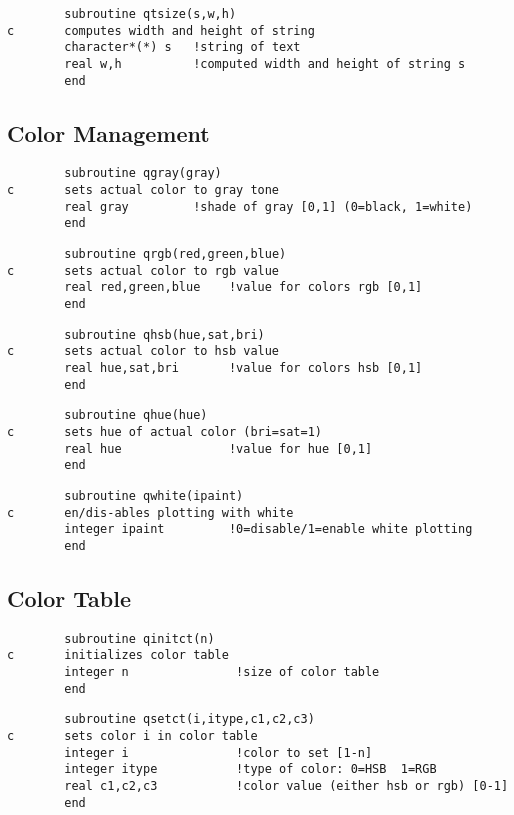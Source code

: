 \documentclass{article}
\begin{document}
\begin{verbatim}
        subroutine qtsize(s,w,h)
c       computes width and height of string
        character*(*) s   !string of text
        real w,h          !computed width and height of string s
        end
\end{verbatim}


\subsection{Color Management}


\begin{verbatim}
        subroutine qgray(gray)
c       sets actual color to gray tone
        real gray         !shade of gray [0,1] (0=black, 1=white)
        end
\end{verbatim}

\begin{verbatim}
        subroutine qrgb(red,green,blue)
c       sets actual color to rgb value
        real red,green,blue    !value for colors rgb [0,1]
        end
\end{verbatim}

\begin{verbatim}
        subroutine qhsb(hue,sat,bri)
c       sets actual color to hsb value
        real hue,sat,bri       !value for colors hsb [0,1]
        end
\end{verbatim}

\begin{verbatim}
        subroutine qhue(hue)
c       sets hue of actual color (bri=sat=1)
        real hue               !value for hue [0,1]
        end
\end{verbatim}

\begin{verbatim}
        subroutine qwhite(ipaint)
c       en/dis-ables plotting with white
        integer ipaint         !0=disable/1=enable white plotting
        end
\end{verbatim}


\subsection{Color Table}


\begin{verbatim}
        subroutine qinitct(n)
c       initializes color table
        integer n               !size of color table
        end
\end{verbatim}

\begin{verbatim}
        subroutine qsetct(i,itype,c1,c2,c3)
c       sets color i in color table
        integer i               !color to set [1-n]
        integer itype           !type of color: 0=HSB  1=RGB
        real c1,c2,c3           !color value (either hsb or rgb) [0-1]
        end
\end{verbatim}
\end{document}
